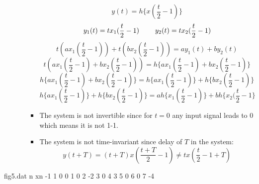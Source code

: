 \documentclass[10pt,a4paper, margin=1in]{article}
\begin{document}
\begin{enumerate}
\begin{enumerate}
\begin{itemize}
        \[y(t) = h\{x(\frac{t}{2} -1)\}\]
        \[y_1(t) = tx_1(\frac{t}{2} -1) \hspace{8mm} y_2(t) = tx_2(\frac{t}{2} -1)\]
        \[t(ax_1(\frac{t}{2} -1)) + t(bx_2(\frac{t}{2} -1)) = ay_1(t) + by_2(t)\]
        \[t(ax_1(\frac{t}{2} -1) + bx_2(\frac{t}{2} -1)) = h\{ax_1(\frac{t}{2} -1) + bx_2(\frac{t}{2} -1)\}\]
        \[h\{ax_1(\frac{t}{2} -1) + bx_2(\frac{t}{2} -1)\} = h\{ax_1(\frac{t}{2} -1)\} + h\{bx_2(\frac{t}{2} -1)\}\]
        \[h\{ax_1(\frac{t}{2} -1)\} + h\{bx_2(\frac{t}{2} -1)\} = ah\{x_1(\frac{t}{2} -1)\} + bh\{x_2(\frac{t}{2} -1\}\]
        \item The system is not invertible since for $t=0$ any input signal leads to 0 which means it is not 1-1.
        \item The system is not time-invariant since delay of $T$ in the system:
        \[y(t+T) = (t+T)x(\frac{t+T}{2} - 1) \neq tx(\frac{t}{2} -1 + T)\]
    \end{itemize}
    \end{enumerate}  

\end{enumerate}

    
 \begin{filecontents}{fig5.dat}
  n   xn
  -1  1
  0   0
  1   0  
  2   -2
  3   0
  4   3 
  5   0
  6   0
  7   -4
 \end{filecontents}
\end{document}
